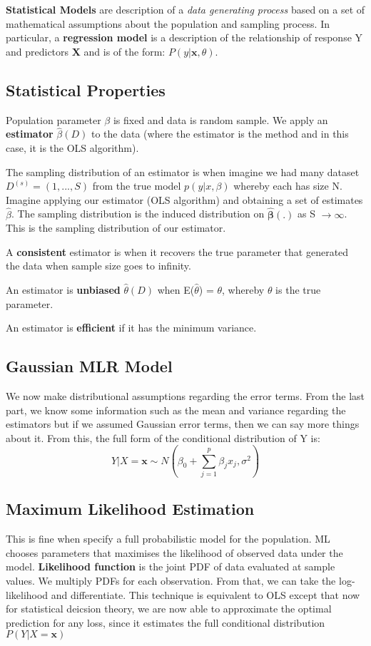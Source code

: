 \documentclass[11pt, oneside]{article}
\theoremstyle{definition}
\begin{document}
\bigskip
\textbf{Statistical Models} are description of a \textit{data generating process} based on a set of mathematical assumptions about the population and sampling process. In particular, a \textbf{regression model} is a description of the relationship of response Y and predictors $\bm{X}$ and is of the form: $P(y|\bm{x},\theta)$.

\subsection{Statistical Properties}
Population parameter $\beta$ is fixed and data is random sample. We apply an \textbf{estimator} $\hat{\beta}(D)$ to the data (where the estimator is the method and in this case, it is the OLS algorithm).

The sampling distribution of an estimator is when imagine we had many dataset $D^{(s)} = (1,...,S)$ from the true model $p(y|x,\beta)$ whereby each has size N. Imagine applying our estimator (OLS algorithm) and obtaining a set of estimates $\hat{\beta}$. The sampling distribution is the induced distribution on $\hat{\bm{\beta}}(.)$ as S $\rightarrow \infty$. This is the sampling distribution of our estimator.

A \textbf{consistent} estimator is when it recovers the true parameter that generated the data when sample size goes to infinity.

An estimator is \textbf{unbiased} $\hat{\theta}(D)$ when E($\hat{\theta}$) = $\theta$, whereby $\theta$ is the true parameter.

An estimator is \textbf{efficient} if it has the minimum variance.

\subsection{Gaussian MLR Model}
We now make distributional assumptions regarding the error terms. From the last part, we know some information such as the mean and variance regarding the estimators but if we assumed Gaussian error terms, then we can say more things about it. From this, the full form of the conditional distribution of Y is:
$$
Y|X=\bm{x} \sim N(\beta_0 + \sum\limits_{j=1}^p\beta_jx_j, \sigma^2)
$$

\subsection{Maximum Likelihood Estimation}
This is fine when specify a full probabilistic model for the population. ML chooses parameters that maximises the likelihood of observed data under the model. \textbf{Likelihood function} is the joint PDF of data evaluated at sample values. We multiply PDFs for each observation. From that, we can take the log-likelihood and differentiate. This technique is equivalent to OLS except that now for statistical deicsion theory, we are now able to approximate the optimal prediction for any loss, since it estimates the full conditional distribution $P(Y|X=\bm{x})$
\end{document}
